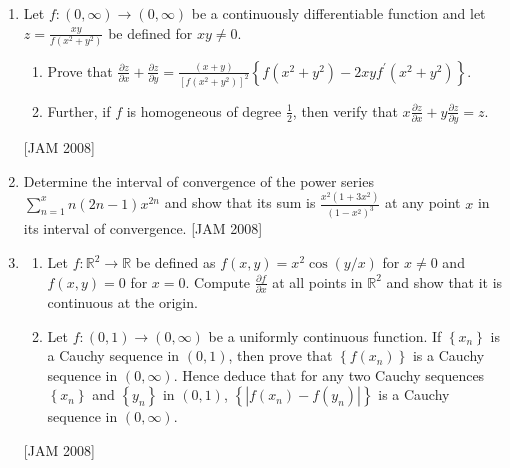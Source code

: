 \begin{enumerate}
\begin{itemize}
  \item $T\left(X_{k}\right)=X_{k-1}, k=1,2, \cdots, n$, where $X_{0}=\{\overrightarrow{0}\}$.

\end{itemize}
Also, find the rank of $T$.
\hfill [JAM 2008]


\item  Let $f:(0, \infty) \rightarrow(0, \infty)$ be a continuously differentiable function and let $z=\frac{x y}{f\left(x^{2}+y^{2}\right)}$ be defined for $x y \neq 0$.

\begin{enumerate}
\item Prove that $\frac{\partial z}{\partial x}+\frac{\partial z}{\partial y}=\frac{(x+y)}{\left[f\left(x^{2}+y^{2}\right)\right]^{2}}\left\{f\left(x^{2}+y^{2}\right)-2 x y f^{\prime}\left(x^{2}+y^{2}\right)\right\}$.

\item  Further, if $f$ is homogeneous of degree $\frac{1}{2}$, then verify that $x \frac{\partial z}{\partial x}+y \frac{\partial z}{\partial y}=z$.
\end{enumerate}
 \hfill [JAM 2008]
 

\item  Determine the interval of convergence of the power series $\sum_{n=1}^{x} n(2 n-1) x^{2 n}$ and show that its sum is $\frac{x^{2}\left(1+3 x^{2}\right)}{\left(1-x^{2}\right)^{3}}$ at any point $x$ in its interval of convergence.
\hfill [JAM 2008]



\item
\begin{enumerate}
\item Let $f: \mathbb{R}^{2} \rightarrow \mathbb{R}$ be defined as $f(x, y)=x^{2} \cos (y / x)$ for $x \neq 0$ and $f(x, y)=0$ for $x=0$. Compute $\frac{\partial f}{\partial x}$ at all points in $\mathbb{R}^{2}$ and show that it is continuous at the origin.

\item  Let $f:(0,1) \rightarrow(0, \infty)$ be a uniformly continuous function. If $\left\{x_{n}\right\}$ is a Cauchy sequence in $(0,1)$, then prove that $\left\{f\left(x_{n}\right)\right\}$ is a Cauchy sequence in $(0, \infty)$. Hence deduce that for any two Cauchy sequences $\left\{x_{n}\right\}$ and $\left\{y_{n}\right\}$ in $(0,1)$, $\left\{\left|f\left(x_{n}\right)-f\left(y_{n}\right)\right|\right\}$ is a Cauchy sequence in $(0, \infty)$.
\end{enumerate}
 \hfill [JAM 2008]





\end{enumerate}
\newpage
